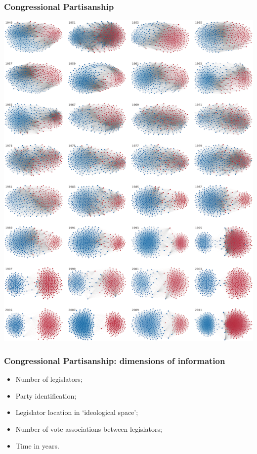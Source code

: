 \documentclass[aspectratio=169]{beamer}
\theoremstyle{principle}
\begin{document}
\begin{frame}
\frametitle{Congressional Partisanship}
\begin{center}
\includegraphics[scale=0.7]{congress_partisanship.png}
\end{center}

\end{frame}

\begin{frame}
\frametitle{Congressional Partisanship: dimensions of information}

\begin{itemize}
\item Number of legislators;
\bigskip
\item Party identification;
\bigskip
\item Legislator location in `ideological space';
\bigskip
\item Number of vote associations between legislators;
\bigskip
\item Time in years.
\end{itemize}

\end{frame}
\end{document}
